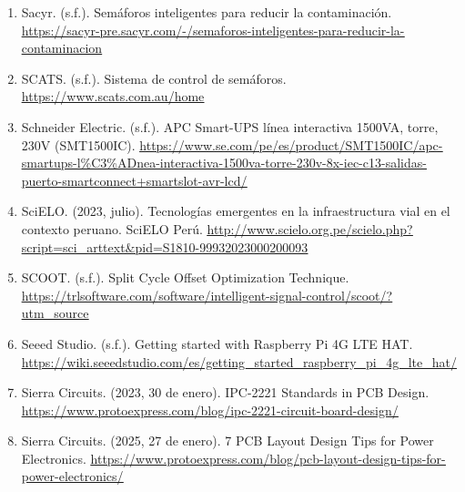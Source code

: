 \documentclass[12pt,a4paper,oneside]{report}
\providecommand{\ul}[1]{\underline{#1}}
\begin{document}
\begin{enumerate}
  Sachan, A., \& Kumar, N. (2024). SDN-enabled quantized LQR for smart traffic light controller to optimize congestion. ACM Transactions on Internet Technology, 24(1), Article No. 7, 1-25. \href{https://acm.pucp.elogim.com/doi/10.1145/3641104}{\ul{https://acm.pucp.elogim.com/doi/10.1145/3641104}}
\item
  Sacyr. (s.f.). Semáforos inteligentes para reducir la contaminación. \href{https://sacyr-pre.sacyr.com/-/semaforos-inteligentes-para-reducir-la-contaminacion}{\ul{https://sacyr-pre.sacyr.com/-/semaforos-inteligentes-para-reducir-la-contaminacion}}
\item
  SCATS. (s.f.). Sistema de control de semáforos. \href{https://www.scats.com.au/home}{\ul{https://www.scats.com.au/home}}
\item
  Schneider Electric. (s.f.). APC Smart-UPS línea interactiva 1500VA, torre, 230V (SMT1500IC). \href{https://www.se.com/pe/es/product/SMT1500IC/apc-smartups-l\%C3\%ADnea-interactiva-1500va-torre-230v-8x-iec-c13-salidas-puerto-smartconnect+smartslot-avr-lcd/}{\ul{https://www.se.com/pe/es/product/SMT1500IC/apc-smartups-l\%C3\%ADnea-interactiva-1500va-torre-230v-8x-iec-c13-salidas-puerto-smartconnect+smartslot-avr-lcd/}}
\item
  SciELO. (2023, julio). Tecnologías emergentes en la infraestructura vial en el contexto peruano. SciELO Perú. \href{http://www.scielo.org.pe/scielo.php?script=sci_arttext&pid=S1810-99932023000200093}{\ul{http://www.scielo.org.pe/scielo.php?script=sci\_arttext\&pid=S1810-99932023000200093}}
\item
  SCOOT. (s.f.). Split Cycle Offset Optimization Technique. \href{https://trlsoftware.com/software/intelligent-signal-control/scoot/?utm_source}{\ul{https://trlsoftware.com/software/intelligent-signal-control/scoot/?utm\_source}}
\item
  Seeed Studio. (s.f.). Getting started with Raspberry Pi 4G LTE HAT. \href{https://wiki.seeedstudio.com/es/getting_started_raspberry_pi_4g_lte_hat/}{\ul{https://wiki.seeedstudio.com/es/getting\_started\_raspberry\_pi\_4g\_lte\_hat/}}
\item
  Sierra Circuits. (2023, 30 de enero). IPC-2221 Standards in PCB Design. \href{https://www.protoexpress.com/blog/ipc-2221-circuit-board-design/}{\ul{https://www.protoexpress.com/blog/ipc-2221-circuit-board-design/}}
\item
  Sierra Circuits. (2025, 27 de enero). 7 PCB Layout Design Tips for Power Electronics. \href{https://www.protoexpress.com/blog/pcb-layout-design-tips-for-power-electronics/}{\ul{https://www.protoexpress.com/blog/pcb-layout-design-tips-for-power-electronics/}}

\end{enumerate}
\end{document}
